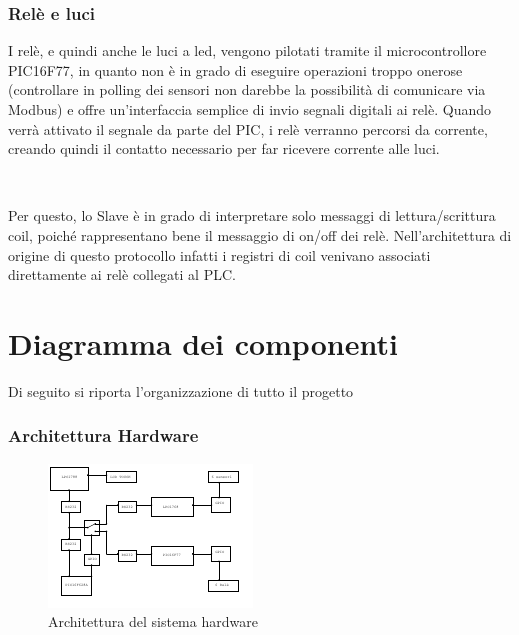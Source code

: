\documentclass[a4paper,titlepage]{book}
\begin{document}
\subsection{Relè e luci}

I relè, e quindi anche le luci a led, vengono pilotati tramite il microcontrollore PIC16F77, in quanto non è in grado di eseguire operazioni troppo onerose (controllare in polling dei sensori non darebbe la possibilità di comunicare via Modbus) e offre un'interfaccia semplice di invio segnali digitali ai relè. Quando verrà attivato il segnale da parte del PIC, i relè verranno percorsi da corrente, creando quindi il contatto necessario per far ricevere corrente alle luci.

~

Per questo, lo Slave è in grado di interpretare solo messaggi di lettura/scrittura coil, poiché rappresentano bene il messaggio di on/off dei relè. Nell'architettura di origine di questo protocollo infatti i registri di coil venivano associati direttamente ai relè collegati al PLC. 


\chapter{Diagramma dei componenti}

Di seguito si riporta l'organizzazione di tutto il progetto

\subsection{Architettura Hardware}

\begin{figure}[!ht]
\centering
\includegraphics[scale=4.5]{archihard.pdf}
\caption{Architettura del sistema hardware}
\end{figure}

\newpage
\end{document}
